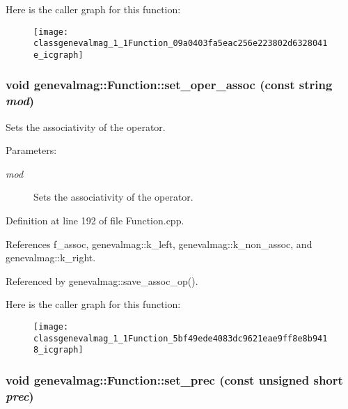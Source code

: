 Here is the caller graph for this function:\nopagebreak
\begin{figure}[H]
\begin{center}
\leavevmode
\texttt{[image: classgenevalmag\_1\_1Function\_09a0403fa5eac256e223802d6328041e\_icgraph]}
\end{center}
\end{figure}
\hypertarget{classgenevalmag_1_1Function_5bf49ede4083dc9621eae9ff8e8b9418}{
\subsubsection[{set\_\-oper\_\-assoc}]{\setlength{\rightskip}{0pt plus 5cm}void genevalmag::Function::set\_\-oper\_\-assoc (const string {\em mod})}}
\label{classgenevalmag_1_1Function_5bf49ede4083dc9621eae9ff8e8b9418}


Sets the associativity of the operator. \begin{Desc}
\item[Parameters:]
\begin{description}
\item[{\em mod}]Sets the associativity of the operator. \end{description}
\end{Desc}


Definition at line 192 of file Function.cpp.

References f\_\-assoc, genevalmag::k\_\-left, genevalmag::k\_\-non\_\-assoc, and genevalmag::k\_\-right.

Referenced by genevalmag::save\_\-assoc\_\-op().

Here is the caller graph for this function:\nopagebreak
\begin{figure}[H]
\begin{center}
\leavevmode
\texttt{[image: classgenevalmag\_1\_1Function\_5bf49ede4083dc9621eae9ff8e8b9418\_icgraph]}
\end{center}
\end{figure}
\hypertarget{classgenevalmag_1_1Function_56dbc3c8050d207b3fb5542d227326b7}{
\subsubsection[{set\_\-prec}]{\setlength{\rightskip}{0pt plus 5cm}void genevalmag::Function::set\_\-prec (const unsigned short {\em prec})}}
\label{classgenevalmag_1_1Function_56dbc3c8050d207b3fb5542d227326b7}


